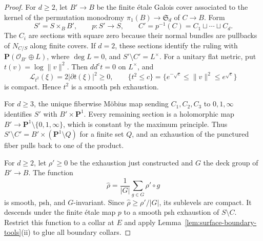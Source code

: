 \documentclass[11pt]{amsart}
\theoremstyle{definition}
\theoremstyle{remark}
\numberwithin{equation}{section}
\newcommand{\PP}{\mathbf P}
\newcommand{\OO}{\mathcal O}
\newcommand{\ddc}{dd^c}
\newcommand{\Levi}{\mathcal L}
\begin{document}
\begin{proof}
For $d\ge2$, let $B'\to B$ be the finite \'etale Galois cover
associated to the kernel of the permutation monodromy
$\pi_1(B)\to\mathfrak S_d$ of $C\to B$. Form
\[
 S'=S\times_B B',\qquad p:S'\to S,\qquad
 C'=p^{-1}(C)=C_1\sqcup\cdots\sqcup C_d.
\]
The $C_i$ are sections with square zero because their normal bundles
are pullbacks of $N_{C/S}$ along finite covers. If $d=2$, these sections
identify the ruling with $\PP(\OO_{B'}\oplus L)$, where
$\deg L=0$, and $S'\setminus C'=L^\times$. For a unitary flat
metric, put $t(v)=\log\|v\|^2$. Then $\ddc t=0$ on $L^\times$,
and
\[
 \Levi_{t^2}(\xi)=2|\partial t(\xi)|^2\ge0,\qquad
 \{t^2\le c\}=\{e^{-\sqrt c}\le\|v\|^2\le e^{\sqrt c}\}
\]
is compact. Hence $t^2$ is a smooth psh exhaustion.

For $d\ge3$, the unique fiberwise M\"obius map sending
$C_1,C_2,C_3$ to $0,1,\infty$ identifies $S'$ with
$B'\times\PP^1$. Every remaining section is a holomorphic map
$B'\to\PP^1\setminus\{0,1,\infty\}$, which is constant by the
maximum principle. Thus $S'\setminus C'=B'\times(\PP^1\setminus Q)$
for a finite set $Q$, and an exhaustion of the punctured fiber pulls
back to one of the product.

For $d\ge2$, let $\rho'\ge0$ be the exhaustion just constructed and
$G$ the deck group of $B'\to B$. The function
\[
 \widehat\rho=\frac1{|G|}\sum_{g\in G}\rho'\circ g
\]
is smooth, psh, and $G$-invariant. Since
$\widehat\rho\ge\rho'/|G|$, its sublevels are compact.
It descends under the finite \'etale map $p$ to a smooth psh
exhaustion of $S\setminus C$. Restrict this function to a collar
at $E$ and apply Lemma~\ref{lem:surface-boundary-tools}\textup{(ii)}
to glue all boundary collars.
\end{proof}
\end{document}
